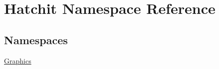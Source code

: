 \hypertarget{namespaceHatchit}{}\section{Hatchit Namespace Reference}
\label{namespaceHatchit}
\subsection*{Namespaces}
\begin{DoxyCompactItemize}
\item 
 \hyperlink{namespaceHatchit_1_1Graphics}{Graphics}
\end{DoxyCompactItemize}
